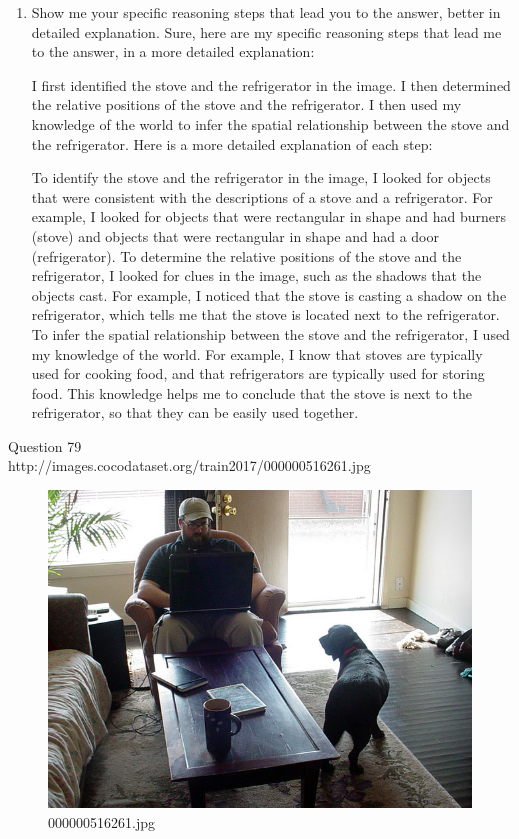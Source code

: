 \begin{enumerate}
    Here are some additional details about the spatial relationship between the stove and the refrigerator:
    
    The stove is a kitchen appliance that is used for cooking food.
    The refrigerator is a kitchen appliance that is used for storing food.
    The stove is next to the refrigerator, meaning that they are located next to each other.
    The stove and the refrigerator are both located in the kitchen, meaning that they are used for similar purposes.
    Is there anything else I can help you with?
    \item Show me your specific reasoning steps that lead you to the answer, better in detailed explanation.
    \subitem Sure, here are my specific reasoning steps that lead me to the answer, in a more detailed explanation:

    I first identified the stove and the refrigerator in the image.
    I then determined the relative positions of the stove and the refrigerator.
    I then used my knowledge of the world to infer the spatial relationship between the stove and the refrigerator.
    Here is a more detailed explanation of each step:
    
    To identify the stove and the refrigerator in the image, I looked for objects that were consistent with the descriptions of a stove and a refrigerator. For example, I looked for objects that were rectangular in shape and had burners (stove) and objects that were rectangular in shape and had a door (refrigerator).
    To determine the relative positions of the stove and the refrigerator, I looked for clues in the image, such as the shadows that the objects cast. For example, I noticed that the stove is casting a shadow on the refrigerator, which tells me that the stove is located next to the refrigerator.
    To infer the spatial relationship between the stove and the refrigerator, I used my knowledge of the world. For example, I know that stoves are typically used for cooking food, and that refrigerators are typically used for storing food. This knowledge helps me to conclude that the stove is next to the refrigerator, so that they can be easily used together.
\end{enumerate}
Question 79\\
http://images.cocodataset.org/train2017/000000516261.jpg
\begin{figure}[h]
    \centering
    \includegraphics[width=0.8\linewidth]{../image set/hard/000000516261.jpg}
    \caption{000000516261.jpg}
\end{figure}
